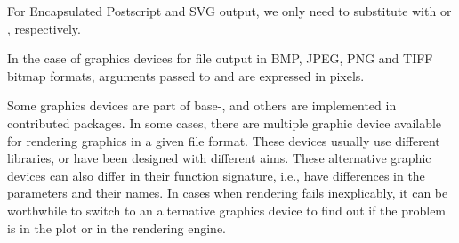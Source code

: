 \documentclass[krantz2]{krantz}\usepackage{knitr}
\begin{document}
For Encapsulated Postscript and SVG output, we only need to substitute  with  or , respectively.

\begin{knitrout}\footnotesize
{}\color{fgcolor}\begin{kframe}
\begin{alltt}
\hlstd{(} \hlstd{=} \hlstd{,}  \hlstd{=} \hlstd{,}  \hlstd{=} \hlstd{)}
\hlstd{()}
\end{alltt}
\end{kframe}
\end{knitrout}

In the case of graphics devices for file output in BMP, JPEG, PNG and TIFF bitmap formats, arguments passed to  and  are expressed in pixels.

\begin{knitrout}\footnotesize
{}\color{fgcolor}\begin{kframe}
\begin{alltt}
\hlstd{(} \hlstd{=} \hlstd{,}  \hlstd{=} \hlstd{,}  \hlstd{=} \hlstd{)}
\hlstd{()}
\end{alltt}
\end{kframe}
\end{knitrout}

\begin{infobox}
Some graphics devices are part of base-\Rlang, and others are implemented in contributed packages. In some cases, there are multiple graphic device available for rendering graphics in a given file format. These devices usually use different libraries, or have been designed with different aims. These alternative graphic devices can also differ in their function signature, i.e., have differences in the parameters and their names. In cases when rendering fails inexplicably, it can be worthwhile to switch to an alternative graphics device to find out if the problem is in the plot or in the rendering engine.
\end{infobox}
\end{document}
